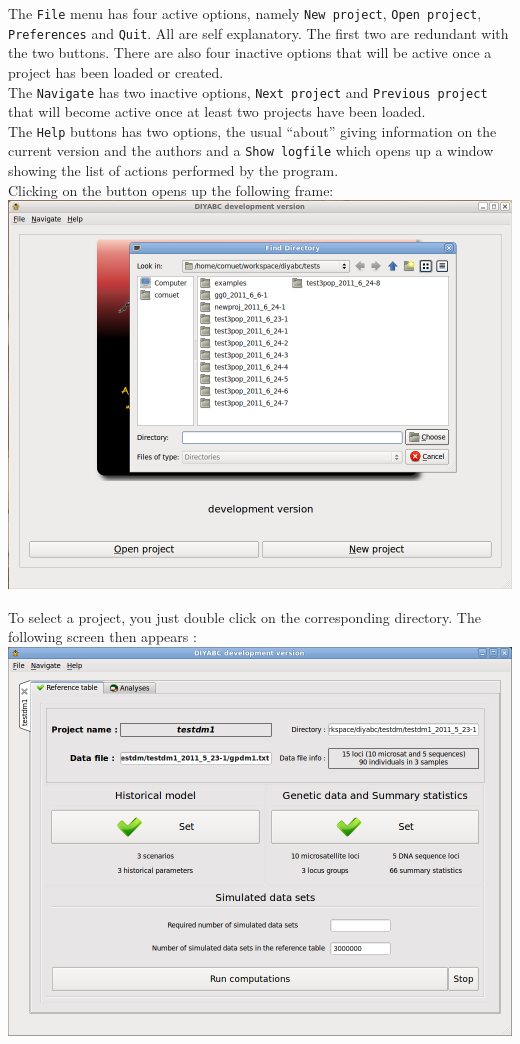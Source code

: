 The \texttt{File} menu has four active options, namely \texttt{New project}, \texttt{Open project}, \texttt{Preferences} and \texttt{Quit}. All are self explanatory. The first two are redundant with the two buttons. There are also four inactive options that will be active once a project has been loaded or created.\\
The \texttt{Navigate} has two inactive options, \texttt{Next project} and \texttt{Previous project} that will become active once at least two projects have been loaded.\\
The \texttt{Help} buttons has two options, the usual ``about'' giving information on the current version and the authors and a \texttt{Show logfile} which opens up a window showing the list of actions performed by the program.\\
  
Clicking on the  button opens up the following frame:\\

\includegraphics[scale=0.4]{gui_pictures/Capture-DIYABC-5.png} 

To select a project, you just double click on the corresponding directory.
\newpage
 The following screen then appears :\\

\includegraphics[scale=0.35]{gui_pictures/Capture-DIYABC-6.png} 

